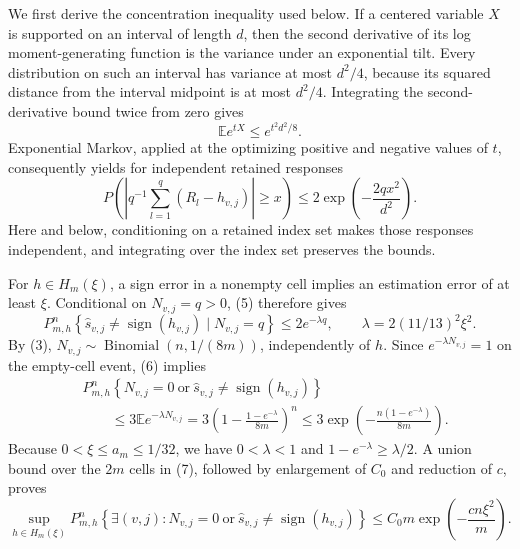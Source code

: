 We first derive the concentration inequality used below. If a centered variable \(X\) is supported on an interval of length \(d\), then the second derivative of its log moment-generating function is the variance under an exponential tilt. Every distribution on such an interval has variance at most \(d^2/4\), because its squared distance from the interval midpoint is at most \(d^2/4\). Integrating the second-derivative bound twice from zero gives
\[
 \mathbb E e^{tX}\leq e^{t^2d^2/8}.
\]
Exponential Markov, applied at the optimizing positive and negative values of \(t\), consequently yields for independent retained responses
\[
 P\!\left(\left|q^{-1}\sum_{l=1}^{q}(R_l-h_{v,j})\right|\geq x\right)
 \leq2\exp\left(-\frac{2qx^2}{d^2}\right).                             \tag{5}
\]
Here and below, conditioning on a retained index set makes those responses independent, and integrating over the index set preserves the bounds.

For \(h\in H_m(\xi)\), a sign error in a nonempty cell implies an estimation error of at least \(\xi\). Conditional on \(N_{v,j}=q>0\), (5) therefore gives
\[
 P_{m,h}^{n}\!\left\{\widehat s_{v,j}\neq\operatorname{sign}(h_{v,j})\mid N_{v,j}=q\right\}
 \leq2e^{-\lambda q},
 \qquad \lambda=2(11/13)^2\xi^2.                                      \tag{6}
\]
By (3), \(N_{v,j}\sim\operatorname{Binomial}(n,1/(8m))\), independently of \(h\). Since \(e^{-\lambda N_{v,j}}=1\) on the empty-cell event, (6) implies
\[
 \begin{split}
 &P_{m,h}^{n}\!\left\{N_{v,j}=0\ \text{or}\ \widehat s_{v,j}\neq\operatorname{sign}(h_{v,j})\right\}\\
 &\qquad\leq3\mathbb E e^{-\lambda N_{v,j}}
 =3\left(1-\frac{1-e^{-\lambda}}{8m}\right)^n
 \leq3\exp\left(-\frac{n(1-e^{-\lambda})}{8m}\right).                 \tag{7}
 \end{split}
\]
Because \(0<\xi\leq a_m\leq1/32\), we have \(0<\lambda<1\) and \(1-e^{-\lambda}\geq\lambda/2\). A union bound over the \(2m\) cells in (7), followed by enlargement of \(C_0\) and reduction of \(c\), proves
\[
 \sup_{h\in H_m(\xi)}P_{m,h}^{n}\!\left\{\exists(v,j):N_{v,j}=0\ \text{or}\ \widehat s_{v,j}\neq\operatorname{sign}(h_{v,j})\right\}
 \leq C_0m\exp\left(-\frac{cn\xi^2}{m}\right).                        \tag{8}
\]


